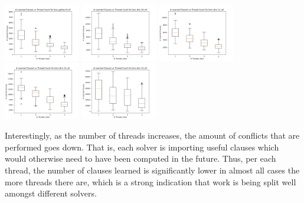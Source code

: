 \documentclass[11pt]{extarticle}
\begin{document}
\includegraphics[width=0.25\textwidth]{figures/bmc-galileo-9lnt.png}
\includegraphics[width=0.25\textwidth]{figures/bmc-ibm-10lnt.png}
\includegraphics[width=0.25\textwidth]{figures/bmc-ibm-11lnt.png}
\includegraphics[width=0.25\textwidth]{figures/bmc-ibm-12lnt.png}
\includegraphics[width=0.25\textwidth]{figures/bmc-ibm-13lnt.png}

Interestingly, as the number of threads increases, the amount of conflicts that are performed
goes down. That is, each solver is importing useful clauses which would otherwise need to have
been computed in the future. Thus, per each thread, the number of clauses learned is
significantly lower in almost all cases the more threads there are, which is a strong indication
that work is being split well amongst different solvers.


\nocite{*}

\end{document}
